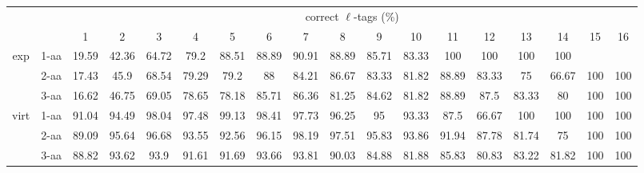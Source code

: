 \documentclass{article}[12pt]
\begin{document}
\begin{landscape}
\begin{table}[h]\tiny
\vspace{3mm}
{\centering
\begin{center}
\begin{tabular}{|c|l|c|c|c|c|c|c|c|c|c|c|c|c|c|c|c|c|}
  \hline
  \multicolumn{2}{|c|}{ } & \multicolumn{ 16 }{|c|}{ correct $\ell$-tags (\%)} \\
  \cline{3- 18}
  \multicolumn{2}{|c|}{ }  & 1 & 2 & 3 & 4 & 5 & 6 & 7 & 8 & 9 & 10 & 11 & 12 & 13 & 14 & 15 & 16\\
  \hline
  \multirow{3}{*}{exp}
&  1-aa  & 19.59 & 42.36 & 64.72 & 79.2 & 88.51 & 88.89 & 90.91 & 88.89 & 85.71 & 83.33 & 100 & 100 & 100 & 100 &  & \\
&  2-aa  & 17.43 & 45.9 & 68.54 & 79.29 & 79.2 & 88 & 84.21 & 86.67 & 83.33 & 81.82 & 88.89 & 83.33 & 75 & 66.67 & 100 & 100\\
&  3-aa  & 16.62 & 46.75 & 69.05 & 78.65 & 78.18 & 85.71 & 86.36 & 81.25 & 84.62 & 81.82 & 88.89 & 87.5 & 83.33 & 80 & 100 & 100\\
 \hline
  \multirow{3}{*}{virt} 
&  1-aa  & 91.04 & 94.49 & 98.04 & 97.48 & 99.13 & 98.41 & 97.73 & 96.25 & 95 & 93.33 & 87.5 & 66.67 & 100 & 100 & 100 & 100\\
&  2-aa  & 89.09 & 95.64 & 96.68 & 93.55 & 92.56 & 96.15 & 98.19 & 97.51 & 95.83 & 93.86 & 91.94 & 87.78 & 81.74 & 75 & 100 & 100\\
&  3-aa  & 88.82 & 93.62 & 93.9 & 91.61 & 91.69 & 93.66 & 93.81 & 90.03 & 84.88 & 81.88 & 85.83 & 80.83 & 83.22 & 81.82 & 100 & 100\\
 \hline
\end{tabular}
\end{center}
\par}
\centering
\vspace{3mm}
\end{table}


\end{landscape}
\end{document}
